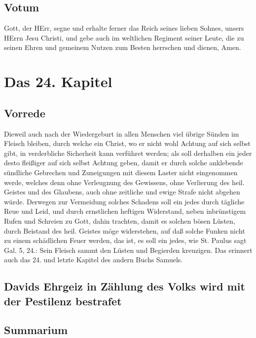 \section{Votum}

Gott, der HErr, segne und erhalte ferner das Reich seines lieben Sohnes, unsers HErrn Jesu Christi, und gebe auch im weltlichen Regiment seiner Leute, die zu seinen Ehren und gemeinem Nutzen zum Besten herrschen und dienen, Amen.

\chapter{Das 24. Kapitel}

\section{Vorrede}

Dieweil auch nach der Wiedergeburt in allen Menschen viel übrige Sünden im Fleisch bleiben, durch welche ein Christ, wo er nicht wohl Achtung auf sich selbst gibt, in verderbliche Sicherheit kann verführet werden; als soll derhalben ein jeder desto fleißiger auf sich selbst Achtung geben, damit er durch solche anklebende sündliche Gebrechen und Zuneigungen mit diesem Laster nicht eingenommen werde, welches denn ohne Verleugnung des Gewissens, ohne Verlierung des heil. Geistes und des Glaubens, auch ohne zeitliche und ewige Strafe nicht abgehen würde. Derwegen zur Vermeidung solches Schadens soll ein jedes durch tägliche Reue und Leid, und durch ernstlichen heftigen Widerstand, neben inbrünstigem Rufen und Schreien zu Gott, dahin trachten, damit es solchen bösen Lüsten, durch Beistand des heil. Geistes möge widerstehen, auf daß solche Funken nicht zu einem schädlichen Feuer werden, das ist, es soll ein jedes, wie St. Paulus sagt Gal. 5, 24.: Sein Fleisch sammt den Lüsten und Begierden kreuzigen. Das erinnert auch das 24. und letzte Kapitel des andern Buchs Samuels.

\section[Davids Ehrgeiz in Zählung des Volks wird mit]{Davids Ehrgeiz in Zählung des Volks wird mit der Pestilenz bestrafet}

\section{Summarium}

